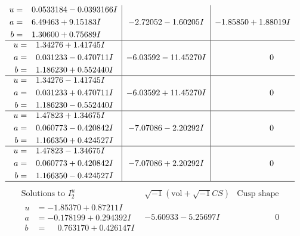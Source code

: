 \documentclass[1p]{elsarticle_modified}
\theoremstyle{definition}
\newcommand{\I}{\sqrt{-1}}
\begin{document}
$$\begin{array}{c|c|c}
\begin{aligned}
u &= \phantom{-}0.0533184 - 0.0393166 I \\
a &= \phantom{-}6.49463 + 9.15183 I \\
b &= \phantom{-}1.30600 + 0.75689 I\end{aligned}
 & -2.72052 - 1.60205 I & -1.85850 + 1.88019 I \\ \hline\begin{aligned}
u &= \phantom{-}1.34276 + 1.41745 I \\
a &= \phantom{-}0.031233 - 0.470711 I \\
b &= \phantom{-}1.186230 + 0.552440 I\end{aligned}
 & -6.03592 - 11.45270 I & \phantom{-0.000000 } 0 \\ \hline\begin{aligned}
u &= \phantom{-}1.34276 - 1.41745 I \\
a &= \phantom{-}0.031233 + 0.470711 I \\
b &= \phantom{-}1.186230 - 0.552440 I\end{aligned}
 & -6.03592 + 11.45270 I & \phantom{-0.000000 } 0 \\ \hline\begin{aligned}
u &= \phantom{-}1.47823 + 1.34675 I \\
a &= \phantom{-}0.060773 - 0.420842 I \\
b &= \phantom{-}1.166350 + 0.424527 I\end{aligned}
 & -7.07086 - 2.20292 I & \phantom{-0.000000 } 0 \\ \hline\begin{aligned}
u &= \phantom{-}1.47823 - 1.34675 I \\
a &= \phantom{-}0.060773 + 0.420842 I \\
b &= \phantom{-}1.166350 - 0.424527 I\end{aligned}
 & -7.07086 + 2.20292 I & \phantom{-0.000000 } 0\\
 \hline 
 \end{array}$$\newpage$$\begin{array}{c|c|c}  
\text{Solutions to }I^u_{2}& \I (\text{vol} + \sqrt{-1}CS) & \text{Cusp shape}\\
 \hline 
\begin{aligned}
u &= -1.85370 + 0.87211 I \\
a &= -0.178199 + 0.294392 I \\
b &= \phantom{-}0.763170 + 0.426147 I\end{aligned}
 & -5.60933 - 5.25697 I & \phantom{-0.000000 } 0 \\ \hline\begin{aligned}

\end{aligned}
\end{array}$$
\end{document}
